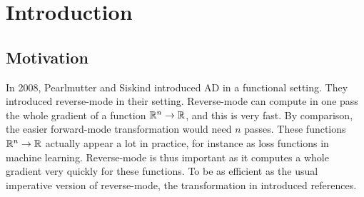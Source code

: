 \section{Introduction}



\subsection{Motivation}

In 2008, Pearlmutter and Siskind \cite{pearlmutter2008reverse} introduced AD in a functional setting. 
They introduced reverse-mode in their setting. 
Reverse-mode can compute in one pass the whole gradient of a function $\mathbb{R}^n\to\mathbb{R}$, and this is very fast.
By comparison, the easier forward-mode transformation would need $n$ passes. 
These functions $\mathbb{R}^n\to\mathbb{R}$ actually appear a lot in practice, for instance as loss functions in machine learning.
Reverse-mode is thus important as it computes a whole gradient very quickly for these functions. 
To be as efficient as the usual imperative version of reverse-mode, the transformation in \cite{pearlmutter2008reverse} introduced references.

